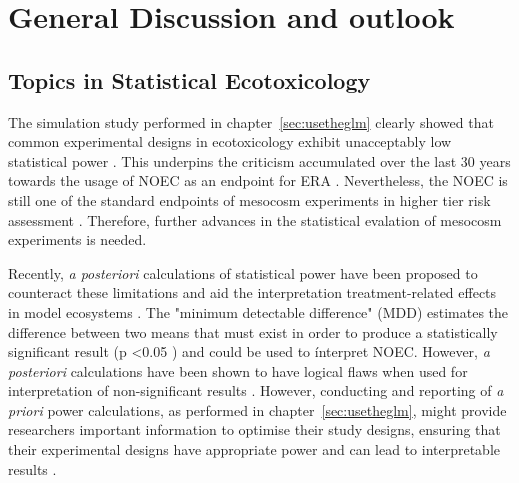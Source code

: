 \chapter{General Discussion and outlook}
\label{sec:discussion} 
 
\section{Topics in Statistical Ecotoxicology}
The simulation study performed in chapter~\ref{sec:usetheglm} clearly showed that common experimental designs in ecotoxicology exhibit unacceptably low statistical power \citep{szocs_statistical_2016, van_der_hoeven_power_1998}.
This underpins the criticism accumulated over the last 30 years towards the usage of NOEC as an endpoint for ERA \citep{fox_comment_2016}. 
Nevertheless, the NOEC is still one of the standard endpoints of mesocosm experiments in higher tier risk assessment \citep{efsa_guidance_2013}.
Therefore, further advances in the statistical evalation of mesocosm experiments is needed.

Recently, \emph{a posteriori} calculations of statistical power have been proposed to counteract these limitations and aid the interpretation treatment-related effects in model ecosystems \citep{brock_minimum_2015}.
The "minimum detectable difference" (MDD) estimates the difference between two means that must exist in order to produce a statistically significant result (p \textless 0.05 \citep{gelman_difference_2006}) and could be used to ínterpret NOEC.
However, \emph{a posteriori} calculations have been shown to have logical flaws when used for interpretation of non-significant results \citep{hoenig_abuse_2001, nakagawa_case_2004}. 
However, conducting and reporting of \emph{a priori} power calculations, as performed in chapter~\ref{sec:usetheglm}, might provide researchers important information to optimise their study designs, ensuring that their experimental designs have appropriate power and can lead to interpretable results \citep{johnson_power_2015}.

